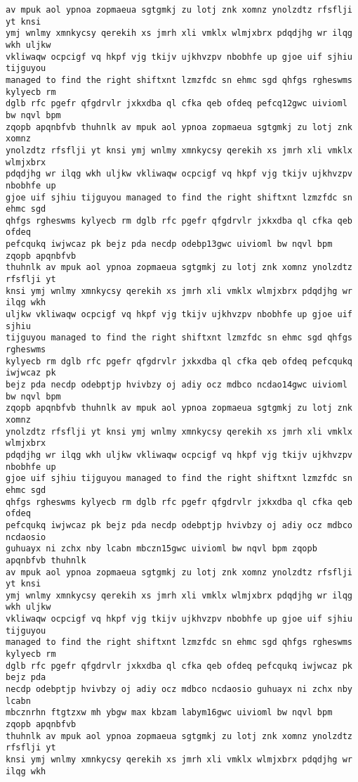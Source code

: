 \documentclass[11pt]{article}
\begin{document}
\begin{tcolorbox}[breakable, size=fbox, boxrule=.5pt, pad at break*=1mm, opacityfill=0]
\begin{Verbatim}[commandchars=\\\{\}]
av mpuk aol ypnoa zopmaeua sgtgmkj zu lotj znk xomnz ynolzdtz rfsflji yt knsi
ymj wnlmy xmnkycsy qerekih xs jmrh xli vmklx wlmjxbrx pdqdjhg wr ilqg wkh uljkw
vkliwaqw ocpcigf vq hkpf vjg tkijv ujkhvzpv nbobhfe up gjoe uif sjhiu tijguyou
managed to find the right shiftxnt lzmzfdc sn ehmc sgd qhfgs rgheswms kylyecb rm
dglb rfc pgefr qfgdrvlr jxkxdba ql cfka qeb ofdeq pefcq12gwc uivioml bw nqvl bpm
zqopb apqnbfvb thuhnlk av mpuk aol ypnoa zopmaeua sgtgmkj zu lotj znk xomnz
ynolzdtz rfsflji yt knsi ymj wnlmy xmnkycsy qerekih xs jmrh xli vmklx wlmjxbrx
pdqdjhg wr ilqg wkh uljkw vkliwaqw ocpcigf vq hkpf vjg tkijv ujkhvzpv nbobhfe up
gjoe uif sjhiu tijguyou managed to find the right shiftxnt lzmzfdc sn ehmc sgd
qhfgs rgheswms kylyecb rm dglb rfc pgefr qfgdrvlr jxkxdba ql cfka qeb ofdeq
pefcqukq iwjwcaz pk bejz pda necdp odebp13gwc uivioml bw nqvl bpm zqopb apqnbfvb
thuhnlk av mpuk aol ypnoa zopmaeua sgtgmkj zu lotj znk xomnz ynolzdtz rfsflji yt
knsi ymj wnlmy xmnkycsy qerekih xs jmrh xli vmklx wlmjxbrx pdqdjhg wr ilqg wkh
uljkw vkliwaqw ocpcigf vq hkpf vjg tkijv ujkhvzpv nbobhfe up gjoe uif sjhiu
tijguyou managed to find the right shiftxnt lzmzfdc sn ehmc sgd qhfgs rgheswms
kylyecb rm dglb rfc pgefr qfgdrvlr jxkxdba ql cfka qeb ofdeq pefcqukq iwjwcaz pk
bejz pda necdp odebptjp hvivbzy oj adiy ocz mdbco ncdao14gwc uivioml bw nqvl bpm
zqopb apqnbfvb thuhnlk av mpuk aol ypnoa zopmaeua sgtgmkj zu lotj znk xomnz
ynolzdtz rfsflji yt knsi ymj wnlmy xmnkycsy qerekih xs jmrh xli vmklx wlmjxbrx
pdqdjhg wr ilqg wkh uljkw vkliwaqw ocpcigf vq hkpf vjg tkijv ujkhvzpv nbobhfe up
gjoe uif sjhiu tijguyou managed to find the right shiftxnt lzmzfdc sn ehmc sgd
qhfgs rgheswms kylyecb rm dglb rfc pgefr qfgdrvlr jxkxdba ql cfka qeb ofdeq
pefcqukq iwjwcaz pk bejz pda necdp odebptjp hvivbzy oj adiy ocz mdbco ncdaosio
guhuayx ni zchx nby lcabn mbczn15gwc uivioml bw nqvl bpm zqopb apqnbfvb thuhnlk
av mpuk aol ypnoa zopmaeua sgtgmkj zu lotj znk xomnz ynolzdtz rfsflji yt knsi
ymj wnlmy xmnkycsy qerekih xs jmrh xli vmklx wlmjxbrx pdqdjhg wr ilqg wkh uljkw
vkliwaqw ocpcigf vq hkpf vjg tkijv ujkhvzpv nbobhfe up gjoe uif sjhiu tijguyou
managed to find the right shiftxnt lzmzfdc sn ehmc sgd qhfgs rgheswms kylyecb rm
dglb rfc pgefr qfgdrvlr jxkxdba ql cfka qeb ofdeq pefcqukq iwjwcaz pk bejz pda
necdp odebptjp hvivbzy oj adiy ocz mdbco ncdaosio guhuayx ni zchx nby lcabn
mbcznrhn ftgtzxw mh ybgw max kbzam labym16gwc uivioml bw nqvl bpm zqopb apqnbfvb
thuhnlk av mpuk aol ypnoa zopmaeua sgtgmkj zu lotj znk xomnz ynolzdtz rfsflji yt
knsi ymj wnlmy xmnkycsy qerekih xs jmrh xli vmklx wlmjxbrx pdqdjhg wr ilqg wkh

\end{Verbatim}
\end{tcolorbox}
\end{document}
